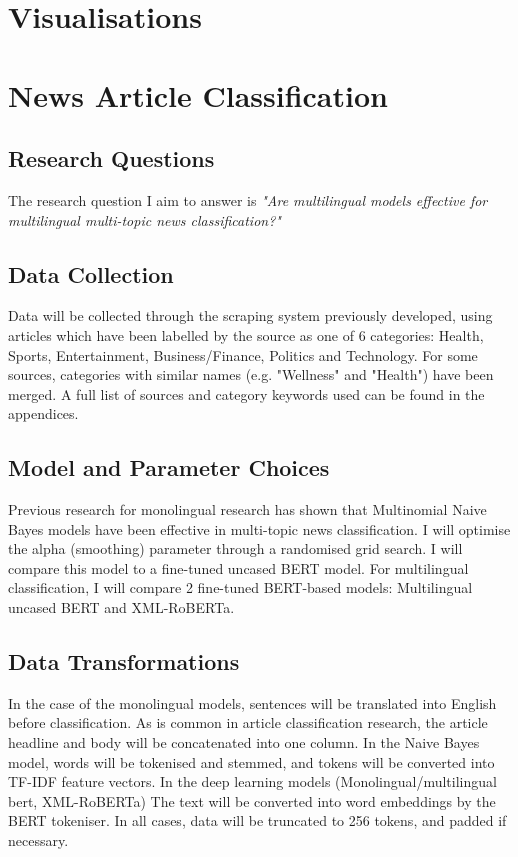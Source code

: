 \documentclass{l4proj}
\begin{document}
\section{Visualisations}

\section{News Article Classification}
\subsection{Research Questions}
The research question I aim to answer is \emph{"Are multilingual models effective for multilingual multi-topic news classification?"}
\subsection{Data Collection}
Data will be collected through the scraping system previously developed, using articles which have been labelled by the source as one of 6 categories: Health, Sports, Entertainment, Business/Finance, Politics and Technology. For some sources, categories with similar names (e.g. "Wellness" and "Health") have been merged. A full list of sources and category keywords used can be found in the appendices.
\subsection{Model and Parameter Choices}
Previous research for monolingual research has shown that Multinomial Naive Bayes models have been effective in multi-topic news classification. I will optimise the alpha (smoothing) parameter through a randomised grid search. I will compare this model to a fine-tuned uncased BERT model. For multilingual classification, I will compare 2 fine-tuned BERT-based models: Multilingual uncased BERT and XML-RoBERTa.
\subsection{Data Transformations}
In the case of the monolingual models, sentences will be translated into English before classification. As is common in article classification research, the article headline and body will be concatenated into one column. In the Naive Bayes model, words will be tokenised and stemmed, and tokens will be converted into TF-IDF feature vectors. In the deep learning models (Monolingual/multilingual bert, XML-RoBERTa) The text will be converted into word embeddings by the BERT tokeniser. In all cases, data will be truncated to 256 tokens, and padded if necessary.
\end{document}
